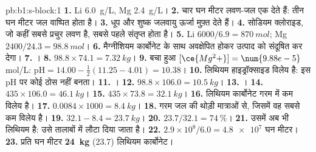 \begin{solution}{pb:b1:s-block:1}
\textbf{1.} Li \qty{6.0}{g/L}, Mg \qty{2.4}{g/L}।
\textbf{2.} चार घन मीटर लवण-जल एक देते हैं: तीन घन मीटर
जल वाष्पित होता है।
\textbf{3.} धूप और शुष्क जलवायु ऊर्जा मुफ़्त देते हैं।
\textbf{4.} सोडियम क्लोराइड, जो कहीं सबसे प्रचुर लवण है, सबसे पहले
संतृप्त होता है।
\textbf{5.} Li $6000/6.9 = \qty{870}{mol}$; Mg $2400/24.3 = \qty{98.8}{mol}$।
\textbf{6.} मैग्नीशियम कार्बोनेट के साथ अवक्षेपित होकर
उत्पाद को संदूषित कर देगा।
\textbf{7.} ।
\textbf{8.} $98.8 \times 74.1 = \qty{7.32}{kg}$।
\textbf{9.} बचा हुआ $[\ce{Mg^2+}] = \num{9.88e-5}$ mol/L: $\mathrm{pH} = 14.00 -
\frac12(11.25 - 4.01) = 10.38$।
\textbf{10.} लिथियम हाइड्रॉक्साइड विलेय है: इस pH पर कोई ठोस नहीं बनता।
\textbf{11.} ।
\textbf{12.} $98.8 \times 106.0 = \qty{10.5}{kg}$।
\textbf{13.} ।
\textbf{14.} $435 \times 106.0 = \qty{46.1}{kg}$।
\textbf{15.} $435 \times 73.8 = \qty{32.1}{kg}$।
\textbf{16.} लिथियम कार्बोनेट गरम में कम विलेय है।
\textbf{17.} $0.0084 \times 1000 = \qty{8.4}{kg}$।
\textbf{18.} गरम जल की थोड़ी मात्राओं से, जिसमें वह सबसे कम
विलेय है।
\textbf{19.} $32.1 - 8.4 = \qty{23.7}{kg}$।
\textbf{20.} $23.7/32.1 = \qty{74}{\percent}$।
\textbf{21.} उसमें अब भी लिथियम है: उसे तालाबों में लौटा दिया जाता है।
\textbf{22.} $2.9 \times 10^8/6.0 = \num{4.8e7}$ घन मीटर।
\textbf{23.} प्रति घन मीटर \textbf{\qty{24}{kg}} (23.7) लिथियम कार्बोनेट।
\end{solution}
